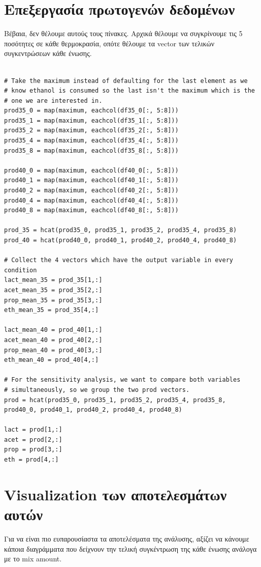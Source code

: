\documentclass[11pt]{article}
\begin{document}
\section{Επεξεργασία πρωτογενών δεδομένων}
\label{sec:org8c3bad6}
Βέβαια, δεν θέλουμε αυτούς τους πίνακες. Αρχικά θέλουμε να συγκρίνουμε τις 5 ποσότητες σε κάθε θερμοκρασία, οπότε θέλουμε τα vector των τελικών συγκεντρώσεων κάθε ένωσης.

\begin{verbatim}

# Take the maximum instead of defaulting for the last element as we
# know ethanol is consumed so the last isn't the maximum which is the
# one we are interested in.
prod35_0 = map(maximum, eachcol(df35_0[:, 5:8]))
prod35_1 = map(maximum, eachcol(df35_1[:, 5:8]))
prod35_2 = map(maximum, eachcol(df35_2[:, 5:8]))
prod35_4 = map(maximum, eachcol(df35_4[:, 5:8]))
prod35_8 = map(maximum, eachcol(df35_8[:, 5:8]))

prod40_0 = map(maximum, eachcol(df40_0[:, 5:8]))
prod40_1 = map(maximum, eachcol(df40_1[:, 5:8]))
prod40_2 = map(maximum, eachcol(df40_2[:, 5:8]))
prod40_4 = map(maximum, eachcol(df40_4[:, 5:8]))
prod40_8 = map(maximum, eachcol(df40_8[:, 5:8]))

prod_35 = hcat(prod35_0, prod35_1, prod35_2, prod35_4, prod35_8)
prod_40 = hcat(prod40_0, prod40_1, prod40_2, prod40_4, prod40_8)

# Collect the 4 vectors which have the output variable in every condition
lact_mean_35 = prod_35[1,:]
acet_mean_35 = prod_35[2,:]
prop_mean_35 = prod_35[3,:]
eth_mean_35 = prod_35[4,:]

lact_mean_40 = prod_40[1,:]
acet_mean_40 = prod_40[2,:]
prop_mean_40 = prod_40[3,:]
eth_mean_40 = prod_40[4,:]

# For the sensitivity analysis, we want to compare both variables
# simultaneously, so we group the two prod vectors.
prod = hcat(prod35_0, prod35_1, prod35_2, prod35_4, prod35_8, prod40_0, prod40_1, prod40_2, prod40_4, prod40_8)

lact = prod[1,:]
acet = prod[2,:]
prop = prod[3,:]
eth = prod[4,:]
\end{verbatim}

\section{Visualization των αποτελεσμάτων αυτών}
\label{sec:org8980b58}
Για να είναι πιο ευπαρουσίαστα τα αποτελέσματα της ανάλυσης, αξίζει να κάνουμε κάποια διαγράμματα που δείχνουν την τελική συγκέντρωση της κάθε ένωσης ανάλογα με το mix amount.
\end{document}

